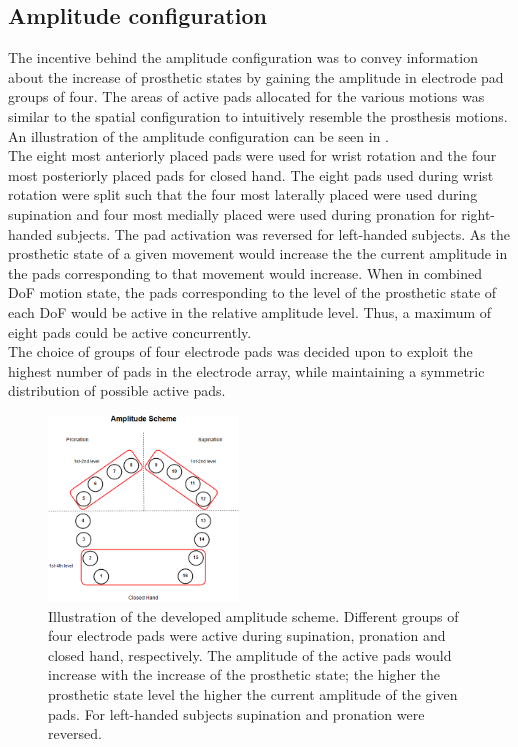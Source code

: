 \subsection{Amplitude configuration}
The incentive behind the amplitude configuration was to convey information about the increase of prosthetic states by gaining the amplitude in electrode pad groups of four. The areas of active pads allocated for the various motions was similar to the spatial configuration to intuitively resemble the prosthesis motions. An illustration of the amplitude configuration can be seen in . \\ 
The eight most anteriorly placed pads were used for wrist rotation and the four most posteriorly placed pads for closed hand. The eight pads used during wrist rotation were split such that the four most laterally placed were used during supination and four most medially placed were used during pronation for right-handed subjects. The pad activation was reversed for left-handed subjects. As the prosthetic state of a given movement would increase the the current amplitude in the pads corresponding to that movement would increase. When in combined DoF motion state, the pads corresponding to the level of the prosthetic state of each DoF would be active in the relative amplitude level. Thus, a maximum of eight pads could be active concurrently. \\
The choice of groups of four electrode pads was decided upon to exploit the highest number of pads in the electrode array, while maintaining a symmetric distribution of possible active pads.

\begin{figure}[H]                 
	\includegraphics[width=0.45\textwidth]{figures/El_array_amplitude}  
	\caption{Illustration of the developed amplitude scheme. Different groups of four electrode pads were active during supination, pronation and closed hand, respectively. The amplitude of the active pads would increase with the increase of the prosthetic state; the higher the prosthetic state level the higher the current amplitude of the given pads. For left-handed subjects supination and pronation were reversed.}
	\label{fig:pa:amplitude} 
\end{figure}
